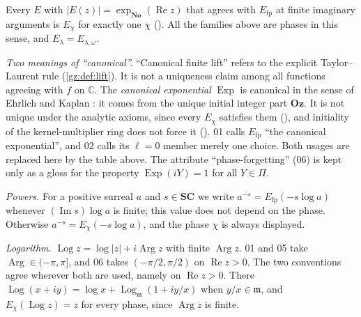 \documentclass[11pt,a4paper]{article}
\numberwithin{equation}{section}
\theoremstyle{definition}
\theoremstyle{remark}
\newcommand{\No}{\mathbf{No}}
\newcommand{\SC}{\mathbf{SC}}
\newcommand{\Oz}{\mathbf{Oz}}
\newcommand{\C}{\mathbb C}
\newcommand{\mm}{\mathfrak m}
\renewcommand{\Re}{\operatorname{Re}}
\renewcommand{\Im}{\operatorname{Im}}
\newcommand{\Arg}{\operatorname{Arg}}
\newcommand{\Log}{\operatorname{Log}}
\newcommand{\Exp}{\operatorname{Exp}}
\newcommand{\Lgm}{\operatorname{Log}_{\mm}}
\newcommand{\Efp}{E_{\mathrm{fp}}}
\begin{document}
Every $E$ with $|E(z)|=\exp_{\No}(\Re z)$ that agrees with $\Efp$ at finite
imaginary arguments is $E_\chi$ for exactly one $\chi$
(). All the families above are
phases in this sense, and $E_\lambda=E_{\lambda,\omega}$.

\emph{Two meanings of ``canonical''.} ``Canonical finite lift'' refers to
the explicit Taylor--Laurent rule (\cref{gz:def:lift}). It is not a
uniqueness claim among all functions agreeing with $f$ on $\C$. The
\emph{canonical exponential} $\Exp$ is canonical in the sense of
Ehrlich and Kaplan \cite[\S11]{EK}: it comes from the unique initial
integer part $\Oz$. It is not unique under the analytic axioms, since every
$E_\chi$ satisfies them (), and initiality
of the kernel-multiplier ring does not force it
(). 01 calls $\Efp$ ``the canonical
exponential'', and 02 calls its $\ell=0$ member merely one choice. Both
usages are replaced here by the table above. The attribute
``phase-forgetting'' (06) is kept only as a gloss for the property
$\Exp(iY)=1$ for all $Y\in\Pi$.

\emph{Powers.} For a positive surreal $a$ and $s\in\SC$ we write
$a^{-s}=\Efp(-s\log a)$ whenever $(\Im s)\log a$ is finite; this value does
not depend on the phase. Otherwise $a^{-s}=E_\chi(-s\log a)$, and the phase
$\chi$ is always displayed.

\emph{Logarithm.} $\Log z=\log|z|+i\Arg z$ with finite $\Arg z$. 01 and 05
take $\Arg\in(-\pi,\pi]$, and 06 takes $(-\pi/2,\pi/2)$ on $\Re z>0$. The
two conventions agree wherever both are used, namely on $\Re z>0$. There
$\Log(x+iy)=\log x+\Lgm(1+iy/x)$ when $y/x\in\mm$, and $E_\chi(\Log z)=z$
for every phase, since $\Arg z$ is finite.
\end{document}
